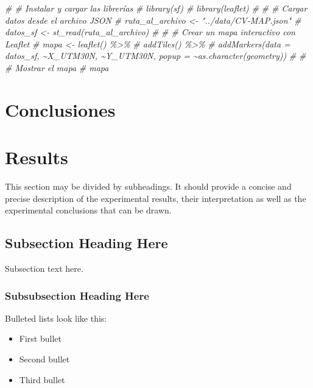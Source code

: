 \documentclass[notspecified,article,submit,moreauthors,pdftex]{Definitions/mdpi}
\newenvironment{Shaded}{\begin{snugshade}}{\end{snugshade}}
\newcommand{\CommentTok}[1]{\textcolor[rgb]{0.56,0.35,0.01}{\textit{#1}}}
\providecommand{\tightlist}{%
  \setlength{\itemsep}{0pt}\setlength{\parskip}{0pt}}
\begin{document}
\begin{Shaded}
\begin{Highlighting}[]
\CommentTok{\# \# Instalar y cargar las librerías}
\CommentTok{\# library(sf)}
\CommentTok{\# library(leaflet)}
\CommentTok{\# }
\CommentTok{\# \# Cargar datos desde el archivo JSON}
\CommentTok{\# ruta\_al\_archivo \textless{}{-} "../data/CV{-}MAP.json"}
\CommentTok{\# datos\_sf \textless{}{-} st\_read(ruta\_al\_archivo)}
\CommentTok{\# }
\CommentTok{\# \# Crear un mapa interactivo con Leaflet}
\CommentTok{\# mapa \textless{}{-} leaflet() \%\textgreater{}\%}
\CommentTok{\#   addTiles() \%\textgreater{}\%}
\CommentTok{\#   addMarkers(data = datos\_sf, \textasciitilde{}X\_UTM30N, \textasciitilde{}Y\_UTM30N, popup = \textasciitilde{}as.character(geometry))}
\CommentTok{\# }
\CommentTok{\# \# Mostrar el mapa}
\CommentTok{\# mapa}
\end{Highlighting}
\end{Shaded}

\hypertarget{conclusiones}{%
\section{Conclusiones}\label{conclusiones}}

\hypertarget{results}{%
\section{Results}\label{results}}

This section may be divided by subheadings. It should provide a concise
and precise description of the experimental results, their
interpretation as well as the experimental conclusions that can be
drawn.

\hypertarget{subsection-heading-here}{%
\subsection{Subsection Heading Here}\label{subsection-heading-here}}

Subsection text here.

\hypertarget{subsubsection-heading-here}{%
\subsubsection{Subsubsection Heading
Here}\label{subsubsection-heading-here}}

Bulleted lists look like this:

\begin{itemize}
\tightlist
\item
  First bullet
\item
  Second bullet
\item
  Third bullet
\end{itemize}
\end{document}
